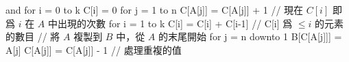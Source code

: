\startCLRSCODE
{} and 
for i = 0 to k
	C[i] = 0
for j = 1 to n
	C[A[j]] = C[A[j]] + 1
// 現在 $C[i]$ 即爲 $i$ 在 $A$ 中出現的次數
for i = 1 to k
	C[i] = C[i] + C[i-1]
// C[i] 爲 $\le i$ 的元素的數目
// 將 $A$ 複製到 $B$ 中，從 $A$ 的末尾開始
for j = n downto 1
	B[C[A[j]]] = A[j]
	C[A[j]] = C[A[j]] - 1	// 處理重複的值
\stopCLRSCODE

